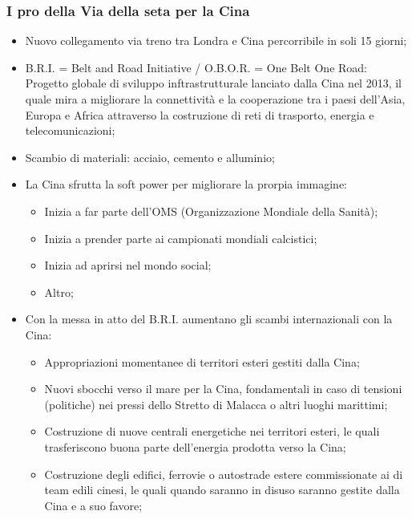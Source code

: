 \documentclass{article}
\begin{document}
\subsubsection{I pro della Via della seta per la Cina}
\begin{itemize}
    \item Nuovo collegamento via treno tra Londra e Cina percorribile in soli 15 giorni;
    \item B.R.I. = Belt and Road Initiative / O.B.O.R. = One Belt One Road:\\
        Progetto globale di sviluppo inftrastrutturale lanciato dalla Cina nel 2013, il quale
        mira a migliorare la connettività e la cooperazione tra i paesi dell'Asia, Europa e 
        Africa attraverso la costruzione di reti di trasporto, energia e telecomunicazioni;
    \item Scambio di materiali: acciaio, cemento e alluminio;
    \item La Cina sfrutta la soft power per migliorare la prorpia immagine:
        \begin{itemize}
            \item Inizia a far parte dell'OMS (Organizzazione Mondiale della Sanità);
            \item Inizia a prender parte ai campionati mondiali calcistici;
            \item Inizia ad aprirsi nel mondo social;
            \item Altro;
        \end{itemize}
    \item Con la messa in atto del B.R.I. aumentano gli scambi internazionali con la Cina:
        \begin{itemize}
            \item Appropriazioni momentanee di territori esteri gestiti dalla Cina;
            \item Nuovi sbocchi verso il mare per la Cina, fondamentali in caso di tensioni
                (politiche) nei pressi dello Stretto di Malacca o altri luoghi marittimi;
            \item Costruzione di nuove centrali energetiche nei territori esteri, le quali
                trasferiscono buona parte dell'energia prodotta verso la Cina;
            \item Costruzione degli edifici, ferrovie o autostrade estere commissionate ai di
                team edili cinesi, le quali quando saranno in disuso saranno gestite dalla
                Cina e a suo favore;  
        \end{itemize}

\end{itemize}
\end{document}

